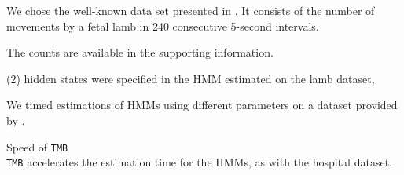 \documentclass[bimj,fleqn]{w-art}\usepackage[]{graphicx}\usepackage[]{color}
\theoremstyle{plain}
\theoremstyle{definition}
\begin{document}
We chose the well-known data set presented in \citet{leroux}. It consists of the number of movements by a fetal lamb in 240 consecutive 5-second intervals.

The counts are available in the supporting information.



($2$) hidden states were specified in the HMM estimated on the lamb dataset,


We timed estimations of HMMs using different parameters on a dataset provided by \citet{leroux}.


Speed of {\tt{TMB}}\\
{\tt{TMB}} accelerates the estimation time for the HMMs, as with the hospital dataset.\\


% 
% 
% 
\end{document}
